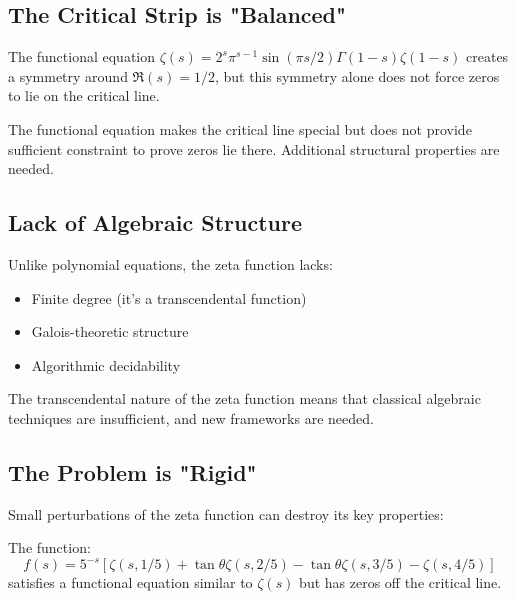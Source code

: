 \subsection{The Critical Strip is "Balanced"}

The functional equation $\zeta(s) = 2^s \pi^{s-1} \sin(\pi s/2) \Gamma(1-s) \zeta(1-s)$ creates a symmetry around $\Re(s) = 1/2$, but this symmetry alone does not force zeros to lie on the critical line.

\begin{remark}
The functional equation makes the critical line special but does not provide sufficient constraint to prove zeros lie there. Additional structural properties are needed.
\end{remark}

\subsection{Lack of Algebraic Structure}

Unlike polynomial equations, the zeta function lacks:
\begin{itemize}
\item Finite degree (it's a transcendental function)
\item Galois-theoretic structure
\item Algorithmic decidability
\end{itemize}

\begin{remark}
The transcendental nature of the zeta function means that classical algebraic techniques are insufficient, and new frameworks are needed.
\end{remark}

\subsection{The Problem is "Rigid"}

Small perturbations of the zeta function can destroy its key properties:

\begin{example}
The function:
\begin{equation}
f(s) = 5^{-s}[\zeta(s,1/5) + \tan\theta \zeta(s,2/5) - \tan\theta \zeta(s,3/5) - \zeta(s,4/5)]
\end{equation}
satisfies a functional equation similar to $\zeta(s)$ but has zeros off the critical line.
\end{example}

